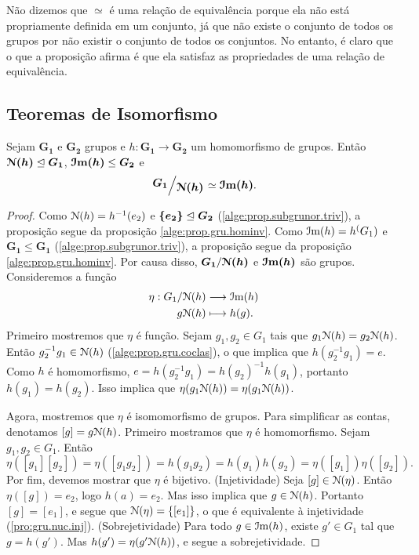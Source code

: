 Não dizemos que $\simeq$ é uma relação de equivalência porque ela não está propriamente definida em um conjunto, já que não existe o conjunto de todos os grupos por não existir o conjunto de todos os conjuntos. No entanto, é claro que o que a proposição afirma é que ela satisfaz as propriedades de uma relação de equivalência.

\subsection{Teoremas de Isomorfismo}

\begin{teo}
Sejam $\bm{G_1}$ e $\bm{G_2}$ grupos e $h: \bm{G_1} \to \bm{G_2}$ um homomorfismo de grupos. Então $\bm{\mathcal{N}(h)} \mathrel{\unlhd} \bm{G_1}$, $\bm{\mathcal{I}\mathrm{m}(h)} \leq \bm{G_2}$ e 
	\begin{equation*}
	\bm{\quo{G_1}{\nuc(h)}} \simeq \bm{\im(h)}.
	\end{equation*}
\end{teo}
\begin{proof} Como $\mathcal{N}(h) = h^{-1}(e_2)$ e $\bm{\{e_2\}} \mathrel{\unlhd} \bm{G_2}$ (\ref{alge:prop.subgrunor.triv}), a proposição segue da proposição \ref{alge:prop.gru.hominv}. Como $\mathcal{I}\mathrm{m}(h) = h^(G_1)$ e $\bm{G_1} \leq \bm{G_1}$ (\ref{alge:prop.subgrunor.triv}), a proposição segue da proposição \ref{alge:prop.gru.hominv}. Por causa disso, $\bm{G_1}/\bm{\mathcal{N}(h)}$ e $\bm{\mathcal{I}\mathrm{m}(h)}$ são grupos. Consideremos a função
		\begin{align*}
		\eta: G_1 / \mathcal{N}(h) &\longrightarrow \mathcal{I}\mathrm{m}(h) \\
			g\mathcal{N}(h) &\longmapsto h(g).
		\end{align*}
Primeiro mostremos que $\eta$ é função. Sejam $g_1,g_2 \in G_1$ tais que $g_1\mathcal{N}(h) = g_2\mathcal{N}(h)$. Então $g_2^{-1}g_1 \in \mathcal{N}(h)$ (\ref{alge:prop.gru.coclas}), o que implica que $h(g_2^{-1}g_1) = e$. Como $h$ é homomorfismo, $e = h(g_2^{-1}g_1) = h(g_2)^{-1}h(g_1)$, portanto $h(g_1)=h(g_2)$. Isso implica que $\eta(g_1\mathcal{N}(h))=\eta(g_1\mathcal{N}(h))$.

Agora, mostremos que $\eta$ é isomomorfismo de grupos. Para simplificar as contas, denotamos $[g] = g\mathcal{N}(h)$. Primeiro mostramos que $\eta$ é homomorfismo. Sejam $g_1,g_2 \in G_1$. Então
	\begin{equation*}
	\eta([g_1][g_2]) = \eta([g_1g_2]) = h(g_1g_2) = h(g_1)h(g_2) = \eta([g_1])\eta([g_2]).
	\end{equation*}
Por fim, devemos mostrar que $\eta$ é bijetivo. (Injetividade) Seja $[g] \in \mathcal{N}(\eta)$. Então $\eta([g])=e_{2}$, logo $h(a)=e_2$. Mas isso implica que $g \in \mathcal{N}(h)$. Portanto $[g]=[e_1]$, e segue que $\mathcal{N}(\eta)=\{[e_1]\}$, o que é equivalente à injetividade (\ref{pro:gru.nuc.inj}). (Sobrejetividade) Para todo $g \in \mathcal{I}\mathrm{m}(h)$, existe $g' \in G_1$ tal que $g=h(g')$. Mas $h(g')=\eta(g'\mathcal{N}(h))$, e segue a sobrejetividade.
\end{proof}

